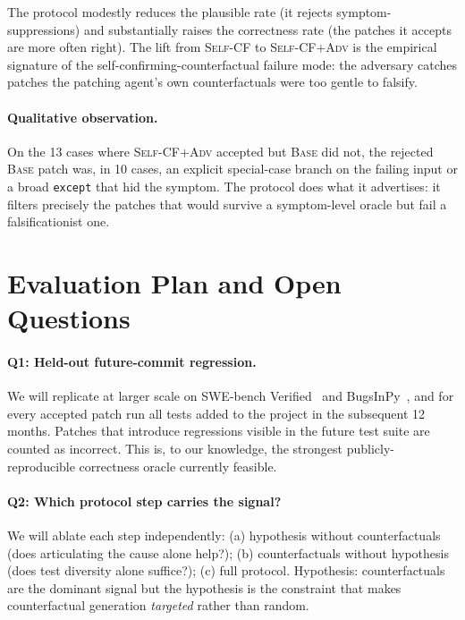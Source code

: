 \documentclass[sigconf,review,anonymous,nonacm]{acmart}
\begin{document}
The protocol modestly reduces the plausible rate (it rejects symptom-
suppressions) and substantially raises the correctness rate (the patches
it accepts are more often right). The lift from \textsc{Self-CF} to
\textsc{Self-CF+Adv} is the empirical signature of the
self-confirming-counterfactual failure mode: the adversary catches
patches the patching agent's own counterfactuals were too gentle to
falsify.

\paragraph{Qualitative observation.} On the 13 cases where
\textsc{Self-CF+Adv} accepted but \textsc{Base} did not, the rejected
\textsc{Base} patch was, in 10 cases, an explicit special-case branch
on the failing input or a broad \texttt{except} that hid the symptom.
The protocol does what it advertises: it filters precisely the patches
that would survive a symptom-level oracle but fail a falsificationist
one.

\section{Evaluation Plan and Open Questions}
\label{sec:plan}

\paragraph{Q1: Held-out future-commit regression.} We will replicate at
larger scale on SWE-bench Verified~\cite{jimenez2024swebench} and
BugsInPy~\cite{widyasari2020bugsinpy}, and for every accepted patch run
all tests added to the project in the subsequent 12 months. Patches
that introduce regressions visible in the future test suite are
counted as incorrect. This is, to our knowledge, the strongest
publicly-reproducible correctness oracle currently feasible.

\paragraph{Q2: Which protocol step carries the signal?} We will ablate
each step independently: (a) hypothesis without counterfactuals (does
articulating the cause alone help?); (b) counterfactuals without
hypothesis (does test diversity alone suffice?); (c) full protocol.
Hypothesis: counterfactuals are the dominant signal but the hypothesis
is the constraint that makes counterfactual generation
\emph{targeted} rather than random.
\end{document}
